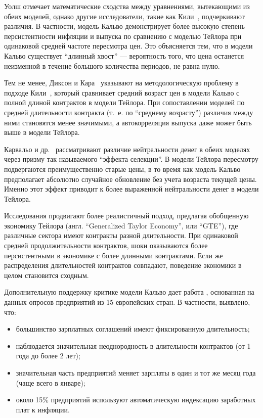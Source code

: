 Уолш \cite{Walsh2010} отмечает математические сходства между уравнениями, вытекающими из обеих моделей, однако другие исследователи, такие как Кили~\cite{kiley2002}, подчеркивают различия. В частности, модель Кальво демонстрирует более высокую степень персистентности инфляции и выпуска по сравнению с моделью Тейлора при одинаковой средней частоте пересмотра цен. Это объясняется тем, что в модели Кальво существует ``длинный хвост'' — вероятность того, что цена останется неизменной в течение большого количества периодов, не равна нулю.

Тем не менее, Диксон и Кара~\cite{dixon2006} указывают на методологическую проблему в подходе Кили~\cite{kiley2002}, который сравнивает средний возраст цен в модели Кальво с полной длиной контрактов в модели Тейлора. При сопоставлении моделей по средней длительности контракта (т.~е. по ``среднему возрасту'') различия между ними становятся менее значимыми, а автокорреляция выпуска даже может быть выше в модели Тейлора.

Карвальо и др.~\cite{carvalho2015} рассматривают различие нейтральности денег в обеих моделях через призму так называемого \enquote{эффекта селекции}. В модели Тейлора пересмотру подвергаются преимущественно старые цены, в то время как модель Кальво предполагает абсолютно случайное обновление без учета возраста текущей цены. Именно этот эффект приводит к более выраженной нейтральности денег в модели Тейлора.

Исследования \cite{dixon2005, dixon2006, dixon2011, kara2010} продвигают более реалистичный подход, предлагая обобщенную экономику Тейлора (англ. ``Generalized Taylor Economy'', или ``GTE''), где различные сектора имеют контракты разной длительности. При одинаковой средней продолжительности контрактов, шоки оказываются более персистентными в экономике с более длинными контрактами. Если же распределения длительностей контрактов совпадают, поведение экономики в целом становится сходным.

Дополнительную поддержку критике модели Кальво дает работа \cite{knell2010}, основанная на данных опросов предприятий из 15 европейских стран. В частности, выявлено, что:
\begin{itemize}
	\item большинство зарплатных соглашений имеют фиксированную длительность;
	\item наблюдается значительная неоднородность в длительности контрактов (от 1 года до более 2 лет);
	\item значительная часть предприятий меняет зарплаты в один и тот же месяц года (чаще всего в январе);
	\item около 15\% предприятий используют автоматическую индексацию заработных плат к инфляции.
\end{itemize}

